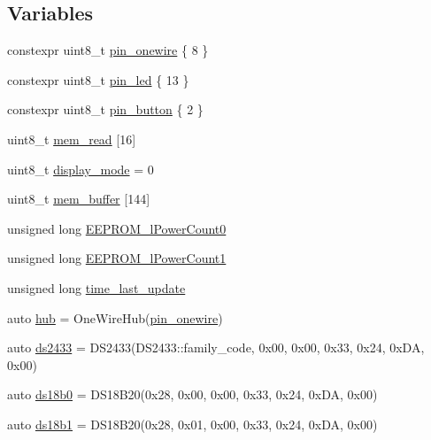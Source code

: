 \subsection*{Variables}
\begin{DoxyCompactItemize}
\item 
constexpr uint8\-\_\-t \hyperlink{OWH__DS2433__EEPROM__LCD__Sensors_8ino_ad4f51a015485d98cc3a8a79f41a81027}{pin\-\_\-onewire} \{ 8 \}
\item 
constexpr uint8\-\_\-t \hyperlink{OWH__DS2433__EEPROM__LCD__Sensors_8ino_add5a7eb759d22b21f8875663ed2c1528}{pin\-\_\-led} \{ 13 \}
\item 
constexpr uint8\-\_\-t \hyperlink{OWH__DS2433__EEPROM__LCD__Sensors_8ino_a13a0c8ba7354e8bfab091549ab594ce5}{pin\-\_\-button} \{ 2 \}
\item 
uint8\-\_\-t \hyperlink{OWH__DS2433__EEPROM__LCD__Sensors_8ino_a618ff393e228f15164df833cb5464dc7}{mem\-\_\-read} \mbox{[}16\mbox{]}
\item 
uint8\-\_\-t \hyperlink{OWH__DS2433__EEPROM__LCD__Sensors_8ino_a7f9b7e8a2f8897f9d6221cc258f63896}{display\-\_\-mode} = 0
\item 
uint8\-\_\-t \hyperlink{OWH__DS2433__EEPROM__LCD__Sensors_8ino_a768b8dfff3adb26417d2833fd19120ef}{mem\-\_\-buffer} \mbox{[}144\mbox{]}
\item 
unsigned long \hyperlink{OWH__DS2433__EEPROM__LCD__Sensors_8ino_aa51ab451790714629df8a1476dd5b116}{E\-E\-P\-R\-O\-M\-\_\-l\-Power\-Count0}
\item 
unsigned long \hyperlink{OWH__DS2433__EEPROM__LCD__Sensors_8ino_aba7bc2b980ffe61d60184741f294502e}{E\-E\-P\-R\-O\-M\-\_\-l\-Power\-Count1}
\item 
unsigned long \hyperlink{OWH__DS2433__EEPROM__LCD__Sensors_8ino_a65605eb57f7500313270f147580cf26c}{time\-\_\-last\-\_\-update}
\item 
auto \hyperlink{OWH__DS2433__EEPROM__LCD__Sensors_8ino_a3beb275f1ae5db0a79499403dd2fbff8}{hub} = One\-Wire\-Hub(\hyperlink{OWH__DS2438__battMon__Test_8ino_ad4f51a015485d98cc3a8a79f41a81027}{pin\-\_\-onewire})
\item 
auto \hyperlink{OWH__DS2433__EEPROM__LCD__Sensors_8ino_acfab931e46e8e28ffc06c70de2a7a806}{ds2433} = D\-S2433(D\-S2433\-::family\-\_\-code, 0x00, 0x00, 0x33, 0x24, 0x\-D\-A, 0x00)
\item 
auto \hyperlink{OWH__DS2433__EEPROM__LCD__Sensors_8ino_ab62c2596d71d9dddf2cd1e30bfaf15ac}{ds18b0} = D\-S18\-B20(0x28, 0x00, 0x00, 0x33, 0x24, 0x\-D\-A, 0x00)
\item 
auto \hyperlink{OWH__DS2433__EEPROM__LCD__Sensors_8ino_a48f142bea8e06f83bc9e7f998d712485}{ds18b1} = D\-S18\-B20(0x28, 0x01, 0x00, 0x33, 0x24, 0x\-D\-A, 0x00)
\end{DoxyCompactItemize}


